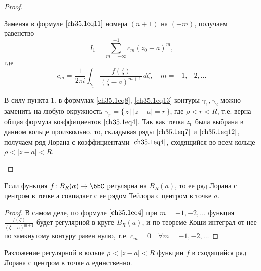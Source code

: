 \begin{proof}
\begin{enumerate}[wide, labelwidth=!, labelindent=\parindent]
Заменяя в формуле $\eqref{ch35.1eq11}$ номера $(n + 1)$ на $(-m)$, получаем равенство
\begin{equation} \label{ch35.1eq12}
I_1 = \sum\limits_{m = -\infty}^{-1} c_m (z_0 - a)^m,
\end{equation}
где
\begin{equation} \label{ch35.1eq13}
c_m = \frac{1}{2\pi i} \int_{\gamma_1} \frac{f(\zeta)}{(\zeta - a)^{m + 1}} \,d\zeta, \quad m = -1,-2,\ldots
\end{equation}

В силу пункта 1. в формулах \eqref{ch35.1eq8}, \eqref{ch35.1eq13} контуры $\gamma_1, \gamma_2$ можно заменить на любую окружность $\gamma_r = \{\, z \,\big|\, |z - a| = r\,\}$, где $\rho < r < R$, т.е. верна общая формула коэффициентов $\eqref{ch35.1eq4}$. Так как точка $z_0$ была выбрана в данном кольце произвольно, то, складывая ряды $\eqref{ch35.1eq7}$ и $\eqref{ch35.1eq12}$, получаем ряд Лорана с коэффициентами $\eqref{ch35.1eq4}$, сходящийся во всем кольце $\rho < |z - a| < R$. \qedhere
\end{enumerate}
\end{proof}

\begin{cons} \label{ch35.1cons1}
Если функция $f \colon B_R(a) \to \bbC$ регулярна на $B_R(a)$, то ее ряд Лорана с центром в точке а совпадает с ее рядом Тейлора с центром в точке $a$.
\end{cons}
\begin{proof}
В самом деле, по формуле $\eqref{ch35.1eq4}$ при $m = -1,-2, \ldots$ функция $\frac{f(\zeta)}{(\zeta - a)^{m+1}}$ будет регулярной в круге $B_R(a)$, и по теореме Коши интеграл от нее по замкнутому контуру равен нулю, т.е. $c_m = 0 \quad \forall m = -1,-2, \ldots$
\end{proof}

\begin{thm} \label{Ch35.1Thm2}
Разложение регулярной в кольце $\rho < |z - a| < R$ функции $f$ в сходящийся ряд Лорана с центром в точке $a$ единственно.
\end{thm}


